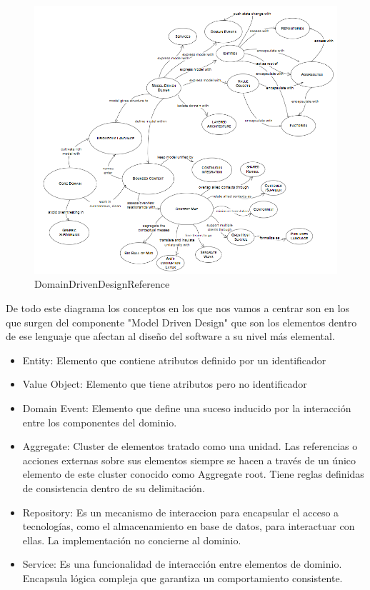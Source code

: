 \begin{figure}[H]
    \centering
    \includegraphics[height=0.5\textheight]{./part/Proyecto_ejecutivo/memoria_descriptiva/infoPreviaAntecedentes/img/DomainDrivenDesignReference}
    \caption{DomainDrivenDesignReference\cite{EricEvans2003DDTC}}\label{fig:DomainDrivenDesignReference}
\end{figure}

De todo este diagrama los conceptos en los que nos vamos a centrar son en los que surgen del componente "Model Driven Design" que son los elementos dentro de ese lenguaje que afectan al diseño del software a su nivel más elemental.

\begin{itemize}
    \item Entity: Elemento que contiene atributos definido por un identificador
    \item Value Object: Elemento que tiene atributos pero no identificador
    \item Domain Event: Elemento que define una suceso inducido por la interacción entre los componentes del dominio.
    \item Aggregate: Cluster de elementos tratado como una unidad. Las referencias o acciones externas sobre sus elementos siempre se hacen a través de un único elemento de este cluster conocido como Aggregate root. Tiene reglas definidas de consistencia dentro de su delimitación.
    \item Repository: Es un mecanismo de interaccion para encapsular el acceso a tecnologías, como el almacenamiento en base de datos, para interactuar con ellas. La implementación no concierne al dominio.
    \item Service: Es una funcionalidad de interacción entre elementos de dominio. Encapsula lógica compleja que garantiza un comportamiento consistente.
\end{itemize}

